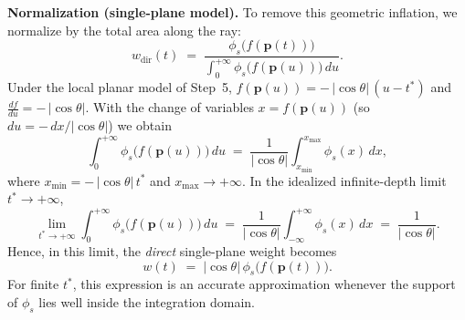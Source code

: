 \begin{enrichment}
\begin{enrichment}
        \medskip
        \noindent\textbf{Normalization (single-plane model).}
        To remove this geometric inflation, we normalize by the total area along the ray:
        \begin{equation}
            w_{\mathrm{dir}}(t)
            \;=\;
            \frac{\phi_s\big(f(\mathbf{p}(t))\big)}
            {\displaystyle\int_{0}^{+\infty}\phi_s\big(f(\mathbf{p}(u))\big)\,du}.
        \end{equation}
        Under the local planar model of Step~5, $f(\mathbf{p}(u))=-\,|\cos\theta|\,(u-t^*)$ and $\tfrac{df}{du}=-\,|\cos\theta|$.  
        With the change of variables $x=f(\mathbf{p}(u))$ (so $du=-\,dx/|\cos\theta|$) we obtain
        \begin{equation}
            \int_{0}^{+\infty}\phi_s\big(f(\mathbf{p}(u))\big)\,du
            \;=\;
            \frac{1}{|\cos\theta|}
            \int_{x_{\min}}^{x_{\max}} \phi_s(x)\,dx,
        \end{equation}
        where $x_{\min} = -\,|\cos\theta|\,t^*$ and $x_{\max} \to +\infty$.
        In the idealized infinite-depth limit $t^*\to+\infty$,
        \begin{equation}
            \lim_{t^*\to+\infty}
            \int_{0}^{+\infty}\phi_s\big(f(\mathbf{p}(u))\big)\,du
            \;=\;
            \frac{1}{|\cos\theta|}
            \int_{-\infty}^{+\infty}\phi_s(x)\,dx
            \;=\;
            \frac{1}{|\cos\theta|}.
        \end{equation}
        Hence, in this limit, the \emph{direct} single-plane weight becomes
        \begin{equation}
            \boxed{\,w(t) \;=\; |\cos\theta|\,\phi_s\!\big(f(\mathbf{p}(t))\big).\,}
        \end{equation}
        For finite $t^*$, this expression is an accurate approximation whenever the support of $\phi_s$ lies well inside the integration domain.
        

\end{enrichment}
\end{enrichment}
